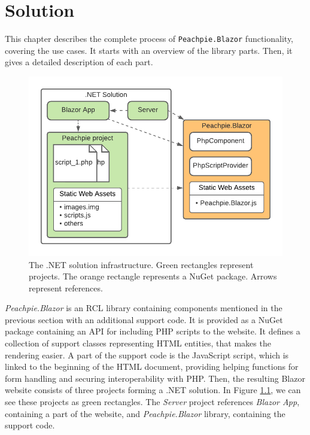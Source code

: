 \chapter{Solution}

This chapter describes the complete process of \texttt{Peachpie.Blazor} functionality, covering the use cases.
It starts with an overview of the library parts.
Then, it gives a detailed description of each part.
\par
\begin{figure}[b!]
\centering
\includegraphics[scale=0.9]{./img/SolutionInfrastructure}
\caption{The .NET solution infrastructure. Green rectangles represent projects. The orange rectangle represents a NuGet package. Arrows represent references.}
\label{img13:infrastructure}
\end{figure} 
\par
\textit{Peachpie.Blazor} is an RCL library containing components mentioned in the previous section with an additional support code.
It is provided as a NuGet package containing an API for including PHP scripts to the website.
It defines a collection of support classes representing HTML entities, that makes the rendering easier.
A part of the support code is the JavaScript script, which is linked to the beginning of the HTML document, providing helping functions for form handling and securing interoperability with PHP.
Then, the resulting Blazor website consists of three projects forming a .NET solution.
In Figure \ref{img13:infrastructure}, we can see these projects as green rectangles.
The \textit{Server} project references \textit{Blazor App}, containing a part of the website, and \textit{Peachpie.Blazor} library, containing the support code.
